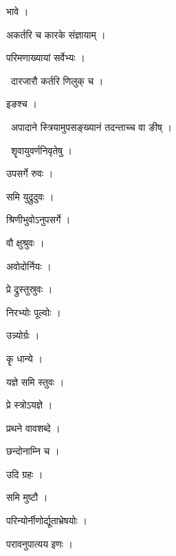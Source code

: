 \documentclass[10pt, openany, oneside]{book}
\begin{document}
\noindent भावे ।

\noindent अकर्तरि च कारके संज्ञायाम् ।

\noindent परिमणाख्यायां सर्वेभ्यः ।

\par\noindent\hspace{1.5em}{\vps वा॰}~{\qt दारजारौ कर्तरि णिलुक् च ।}

\noindent इङश्च ।

\par\noindent\hspace{1.5em}{\vps वा॰}~{\qt अपादाने स्त्रियामुपसङ्ख्यानं तदन्ताच्च वा ङीष् ।}

\par\noindent\hspace{1.5em}{\vps वा॰}~{\qt शॄवायुवर्णनिवृतेषु ।}

\noindent उपसर्गे रुवः ।

\noindent समि युद्रुदुवः ।

\noindent श्रिणीभुवोऽनुपसर्गे ।

\noindent वौ क्षुश्रुवः ।

\noindent अवोदोर्नियः ।

\noindent प्रे द्रुस्तुस्रुवः ।

\noindent निरभ्योः पूल्वोः ।

\noindent उन्न्योर्ग्रः ।

\noindent कॄ धान्ये ।

\noindent यज्ञे समि स्तुवः ।

\noindent प्रे स्त्रोऽयज्ञे ।

\noindent प्रथने वावशब्दे ।

\noindent छन्दोनाम्नि च ।

\noindent उदि ग्रहः ।

\noindent समि मुष्टौ ।

\noindent परिन्योर्नीणोर्द्यूताभ्रेषयोः ।

\noindent परावनुपात्यय इणः ।
\end{document}
